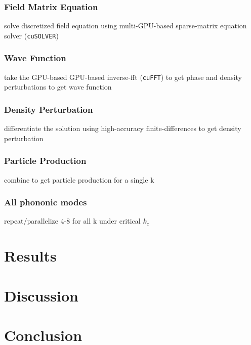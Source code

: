 \documentclass{article}
\begin{document}
        \subsubsection{Field Matrix Equation}

            solve discretized field equation using multi-GPU-based sparse-matrix equation solver (\verb|cuSOLVER|)

        \subsubsection{Wave Function}

            take the GPU-based GPU-based inverse-fft (\verb|cuFFT|) to get phase and density perturbations to get wave function

        \subsubsection{Density Perturbation}

            differentiate the solution using high-accuracy finite-differences to get density perturbation

        \subsubsection{Particle Production}

            combine to get particle production for a single k

        \subsubsection{All phononic modes}

            repeat/parallelize 4-8 for all k under critical $k_c$

    \section{Results}

    \section{Discussion}

    \section{Conclusion}

\end{document}

